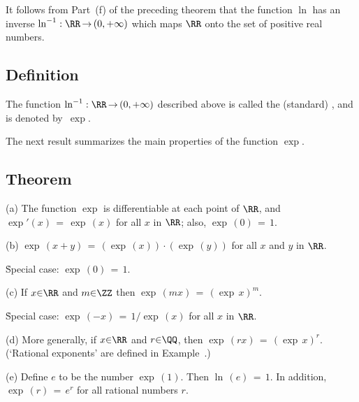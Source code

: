         It follows from Part~(f) of the preceding theorem that the function ${\ln}$ has an inverse ${\ln}^{-1}:{\RR} \,{\rightarrow}\, (0,+{\infty})$ which maps ${\RR}$ onto the set of positive real numbers.

\V

             \subsection{\small{\bf Definition}}
            \label{DefE45.127D}

        The function ${\ln}^{-1}:{\RR} \,{\rightarrow}\, (0,+{\infty})$ described above is called the (standard) {\bf {}},
    and is denoted by~$\exp$.

\V


        The next result summarizes the main properties of the function $\exp$.

\V

             \subsection{\small{\bf Theorem}}
            \label{ThmE45.127E}

\V

\hspace*{\parindent}(a) The function ${\exp}$ is differentiable at each point of ${\RR}$, and ${\exp}'(x) \,=\, {\exp}\,(x)$ for all $x$ in ${\RR}$; also, ${\exp}\,(0) \,=\, 1$.

\V

        (b) ${\exp}\,(x+y) \,=\, ({\exp}\,(x)){\cdot}({\exp}\,(y))$ for all $x$ and $y$ in ${\RR}$.

        \h Special case: ${\exp}\,(0) \,=\, 1$.

\V

        (c) If $x{\in}{\RR}$ and $m{\in}{\ZZ}$ then ${\exp}\,(mx) \,=\, \left({\exp}\,x\right)^{m}$.

        \h Special case: ${\exp}\,(-x) \,=\, 1/{\exp}\,(x)$ for all $x$ in ${\RR}$.

\V

        (d) More generally, if $x{\in}{\RR}$ and $r{\in}{\QQ}$, then ${\exp}\,(rx) \,=\, \left({\exp}\,x\right)^{r}$.
    (`Rational exponents' are defined in Example~.)

\V

        (e) Define $e$ to be the number ${\exp}\,(1)$. Then ${\ln}\,(e) \,=\, 1$.
    In addition, ${\exp}\,(r) \,=\, e^{r}$ for all rational numbers $r$.

